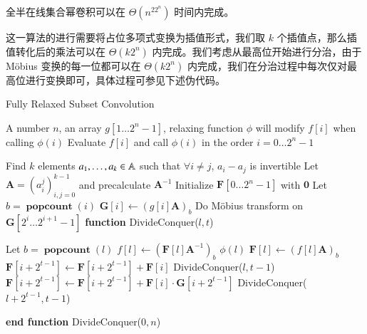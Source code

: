 \begin{theorem}
全半在线集合幂卷积可以在 $\Theta(n^22^n)$ 时间内完成。
\end{theorem}

这一算法的进行需要将占位多项式变换为插值形式，我们取 $k$ 个插值点，那么插值转化后的乘法可以在 $\Theta(k2^n)$ 内完成。我们考虑从最高位开始进行分治，由于 M\"obius 变换的每一位都可以在 $\Theta(k2^n)$ 内完成，我们在分治过程中每次仅对最高位进行变换即可，具体过程可参见下述伪代码。

\begin{breakablealgorithm}
  \caption{Fully Relaxed Subset Convolution}
  \begin{algorithmic}[1]
    \REQUIRE A number $n$, an array $g[1\dots 2^n-1]$, relaxing function $\phi$ will modify $f[i]$ when calling $\phi(i)$
    \ENSURE Evaluate $f[i]$ and call $\phi(i)$ in the order $i=0\dots 2^n-1$
   
    \STATE Find $k$ elements $a_1,\dots,a_k\in \mathbb A$ such that $\forall i\neq j$, $a_i-a_j$ is invertible
    \STATE Let $\mathbf A = (a_i^j)_{i,j=0}^{k-1}$ and precalculate $\mathbf A^{-1}$
    \STATE Initialize $\mathbf F[0\dots 2^n-1]$ with $\mathbf 0$
      \STATE Let $b = \operatorname{\mathbf{popcount}}(i)$
      \STATE $\mathbf G[i] \leftarrow (g[i] \mathbf A)_b$
    \ENDFOR
      \STATE Do M\"obius transform on $\mathbf G[2^i\dots 2^{i+1}-1]$
    \ENDFOR
    \STATE \textbf{function} DivideConquer($l, t$) \COMMENT {solve $[l, l+2^t)$}
    \begin{ALC@g} %
      \STATE Let $b = \operatorname{\mathbf{popcount}}(l)$
      \STATE $f[l] \leftarrow (\mathbf F[l] \mathbf A^{-1})_b$ 
      \STATE $\phi(l)$
      \STATE $\mathbf F[l] \leftarrow (f[l] \mathbf A)_b$
    \ELSE
        \STATE $\mathbf F[i + 2^{t-1}] \leftarrow \mathbf F[i + 2^{t-1}] + \mathbf F[i]$
      \ENDFOR
      \STATE DivideConquer($l, t-1$)
        \STATE $\mathbf F[i + 2^{t-1}] \leftarrow \mathbf F[i + 2^{t-1}] + \mathbf F[i] \cdot \mathbf G[i + 2^{t-1}]$
      \ENDFOR
      \STATE DivideConquer($l+2^{t-1}, t-1$)
    \ENDIF
    \end{ALC@g}
    \STATE \textbf{end function}
    \STATE DivideConquer($0, n$)
  \end{algorithmic}
\end{breakablealgorithm}

